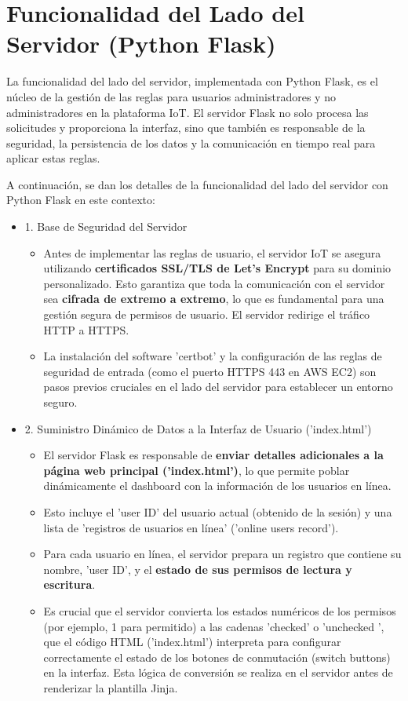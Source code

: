 \documentclass{report}
\begin{document}
\section{Funcionalidad del Lado del Servidor (Python Flask)}
La funcionalidad del lado del servidor, implementada con Python Flask, es el núcleo de la gestión de las reglas para usuarios administradores y no 
administradores  en la plataforma IoT. El servidor Flask no solo procesa las solicitudes y proporciona la interfaz, sino que también es responsable de la 
seguridad, la persistencia de los datos y la comunicación en tiempo real para aplicar estas reglas.

A continuación, se dan los detalles de la funcionalidad del lado del servidor con Python Flask en este contexto:
\begin{itemize}
    \item 1. Base de Seguridad del Servidor
    \begin{itemize}
        \item Antes de implementar las reglas de usuario, el servidor IoT se asegura utilizando \textbf{certificados SSL/TLS de Let's Encrypt} para su 
        dominio personalizado. Esto garantiza que toda la comunicación con el servidor sea \textbf{cifrada de extremo a extremo}, lo que es fundamental para 
        una gestión segura de permisos de usuario. El servidor redirige el tráfico HTTP a HTTPS.
        \item La instalación del software 'certbot' y la configuración de las reglas de seguridad de entrada (como el puerto HTTPS 443 en AWS EC2) son pasos 
        previos cruciales en el lado del servidor para establecer un entorno seguro.
    \end{itemize}

    \item 2. Suministro Dinámico de Datos a la Interfaz de Usuario ('index.html')
    \begin{itemize}
        \item El servidor Flask es responsable de \textbf{enviar detalles adicionales a la página web principal ('index.html')}, lo que permite poblar 
        dinámicamente el dashboard con la información de los usuarios en línea.
        \item Esto incluye el 'user ID' del usuario actual (obtenido de la sesión) y una lista de 'registros de usuarios en línea' ('online users record').
        \item Para cada usuario en línea, el servidor prepara un registro que contiene su nombre, 'user ID', y el \textbf{estado de sus permisos de 
        lectura y escritura}.
        \item Es crucial que el servidor convierta los estados numéricos de los permisos (por ejemplo, 1 para permitido) a las cadenas 'checked' o 
         'unchecked ', que el código HTML ('index.html') interpreta para configurar correctamente el estado de los botones de conmutación (switch buttons) 
        en la interfaz. Esta lógica de conversión se realiza en el servidor antes de renderizar la plantilla Jinja.
    \end{itemize}


\end{itemize}
\end{document}
